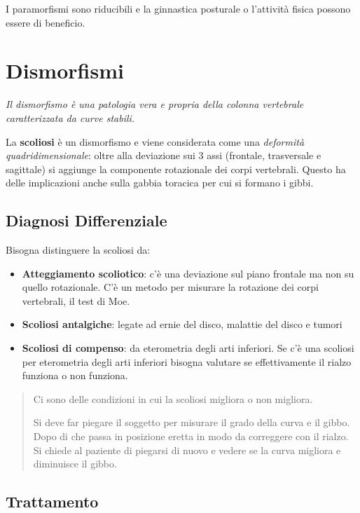 I paramorfismi sono riducibili e la ginnastica posturale o l'attività
fisica possono essere di beneficio.

\section{Dismorfismi}


\emph{Il dismorfismo è una patologia vera e propria della colonna
vertebrale caratterizzata da curve stabili.}

La \textbf{scoliosi} è un dismorfismo e viene considerata come una
\emph{deformità quadridimensionale}: oltre alla deviazione sui 3 assi
(frontale, trasversale e sagittale) si aggiunge la componente
rotazionale dei corpi vertebrali. Questo ha delle implicazioni anche
sulla gabbia toracica per cui si formano i gibbi.

\subsection{Diagnosi Differenziale}


Bisogna distinguere la scoliosi da:

\begin{itemize}
\item
  \textbf{Atteggiamento scoliotico}: c'è una deviazione sul piano
  frontale ma non su quello rotazionale. C'è un metodo per misurare la
  rotazione dei corpi vertebrali, il test di Moe.
\item
  \textbf{Scoliosi antalgiche}: legate ad ernie del disco, malattie del
  disco e tumori
\item
  \textbf{Scoliosi di compenso}: da eterometria degli arti inferiori. Se
  c'è una scoliosi per eterometria degli arti inferiori bisogna valutare
  se effettivamente il rialzo funziona o non funziona.
\end{itemize}

\begin{quote}
Ci sono delle condizioni in cui la scoliosi migliora o non migliora.

Si deve far piegare il soggetto per misurare il grado della curva e il
gibbo. Dopo di che passa in posizione eretta in modo da correggere con
il rialzo. Si chiede al paziente di piegarsi di nuovo e vedere se la
curva migliora e diminuisce il gibbo.
\end{quote}

\subsection{Trattamento}


